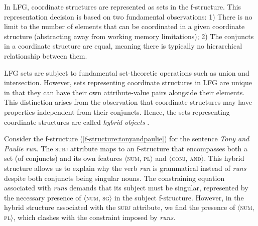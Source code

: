 In LFG, coordinate structures are represented as sets in the f-structure. This representation decision is based on two fundamental observations: 1) There is no limit to the number of elements that can be coordinated in a given coordinate structure (abstracting away from working memory limitations); 2) The conjuncts in a coordinate structure are equal, meaning there is typically no hierarchical relationship between them. 

LFG sets are subject to fundamental set-theoretic operations such as union and intersection. However, sets representing coordinate structures in LFG are unique in that they can have their own attribute-value pairs alongside their elements. This distinction arises from the observation that coordinate structures may have properties independent from their conjuncts. Hence, the sets representing coordinate structures are called \textit{hybrid objects} \citep[][pp.\ 49--50]{Dalrymple2019}.

Consider the f-structure (\ref{f-structure:tonyandpaulie}) for the sentence \textit{Tony and Paulie run}. The \textsc{subj} attribute maps to an f-structure that encompasses both a set (of conjuncts) and its own features $\langle$\textsc{num, pl}$\rangle$ and $\langle$\textsc{conj, and}$\rangle$. This hybrid structure allows us to explain why the verb \textit{run} is grammatical instead of \textit{runs} despite both conjuncts being singular nouns. The constraining equation associated with \textit{runs} demands that its subject must be singular, represented by the necessary presence of $\langle$\textsc{num, sg}$\rangle$ in the subject f-structure. However, in the hybrid structure associated with the \textsc{subj} attribute, we find the presence of $\langle$\textsc{num, pl}$\rangle$, which clashes with the constraint imposed by \textit{runs}.

\pex
\label{f-structure:tonyandpaulie}
\xe

